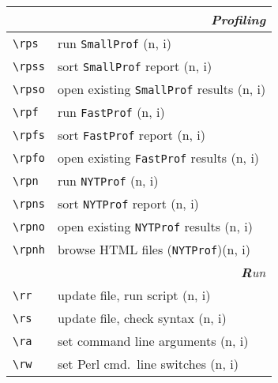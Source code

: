 \documentclass[oneside,10pt,landscape,DIV17]{scrartcl}
\begin{document}
%
\newpage
%
%
\begin{multicols}{2}
%
\begin{tabular}[]{|p{11mm}|p{61mm}|}
\hline
\multicolumn{2}{|r|}{\textsl{\textbf{P}rofiling}}                 \\[1.0ex]
\hline \verb'\rps'     & run \verb'SmallProf'                    \hfill (n, i)\\
\hline \verb'\rpss'    & sort \verb'SmallProf' report            \hfill (n, i)\\
\hline \verb'\rpso'    & open existing \verb'SmallProf' results  \hfill (n, i)\\
\hline
%
\hline \verb'\rpf'     & run \verb'FastProf'                    \hfill (n, i)\\
\hline \verb'\rpfs'    & sort \verb'FastProf' report            \hfill (n, i)\\
\hline \verb'\rpfo'    & open existing \verb'FastProf' results  \hfill (n, i)\\
%
\hline
\hline \verb'\rpn'     & run \verb'NYTProf'                    \hfill (n, i)\\
\hline \verb'\rpns'    & sort \verb'NYTProf' report            \hfill (n, i)\\
\hline \verb'\rpno'    & open existing \verb'NYTProf' results  \hfill (n, i)\\
\hline \verb'\rpnh'    & browse HTML files (\verb'NYTProf')\hfill (n, i)\\
\hline
\hline
\multicolumn{2}{|r|}{\textsl{\textbf{R}un}} \\[1.0ex]
\hline \verb'\rr'    & update file, run script                  \hfill (n, i)   \\
\hline \verb'\rs'    & update file, check syntax                \hfill (n, i)   \\
\hline \verb'\ra'    & set command line arguments               \hfill (n, i)   \\
\hline \verb'\rw'    & set Perl cmd.\ line switches             \hfill (n, i)   \\

\end{tabular}
\end{multicols}
\end{document}
